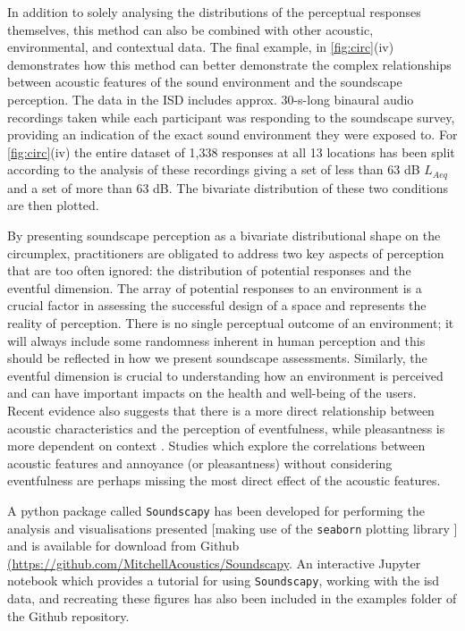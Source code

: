 In addition to solely analysing the distributions of the perceptual responses themselves, this method can also be combined with other acoustic, environmental, and contextual data. The final example, in \cref{fig:circ}(iv) demonstrates how this method can better demonstrate the complex relationships between acoustic features of the sound environment and the soundscape perception. The data in the ISD includes approx. 30-s-long binaural audio recordings taken while each participant was responding to the soundscape survey, providing an indication of the exact sound environment they were exposed to. For \cref{fig:circ}(iv) the entire dataset of 1,338 responses at all 13 locations has been split according to the analysis of these recordings giving a set of less than 63 dB $L_{Aeq}$ and a set of more than 63 dB. The bivariate distribution of these two conditions are then plotted.

By presenting soundscape perception as a bivariate distributional shape on the circumplex, practitioners are obligated to address two key aspects of perception that are too often ignored: the distribution of potential responses and the eventful dimension. The array of potential responses to an environment is a crucial factor in assessing the successful design of a space and represents the reality of perception. There is no single perceptual outcome of an environment; it will always include some randomness inherent in human perception and this should be reflected in how we present soundscape assessments. Similarly, the eventful dimension is crucial to understanding how an environment is perceived and can have important impacts on the health and well-being of the users. Recent evidence also suggests that there is a more direct relationship between acoustic characteristics and the perception of eventfulness, while pleasantness is more dependent on context \citep{Mitchell2021Investigating}. Studies which explore the correlations between acoustic features and annoyance (or pleasantness) without considering eventfulness are perhaps missing the most direct effect of the acoustic features.

A python package called \texttt{Soundscapy} has been developed for performing the analysis and visualisations presented [making use of the \texttt{seaborn} plotting library \citep{Waskom2021seaborn}] and is available for download from Github \url{(https://github.com/MitchellAcoustics/Soundscapy}. An interactive Jupyter notebook which provides a tutorial for using \texttt{Soundscapy}, working with the \gls{isd} data, and recreating these figures has also been included in the examples folder of the Github repository.

